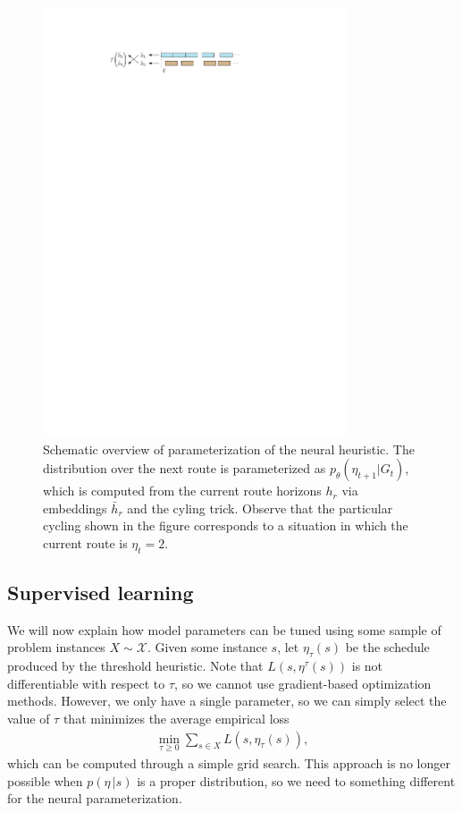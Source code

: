 \documentclass[a4paper]{article}
\theoremstyle{definition}
\theoremstyle{plain}
\begin{document}
\begin{figure}
  \centering
  \includegraphics[width=0.8\textwidth]{figures/single/embedding}
  \caption{Schematic overview of parameterization of the neural heuristic. The
    distribution over the next route is parameterized as
    $p_{\theta}(\eta_{t+1} | G_{t})$, which is computed from the current route horizons
    $h_{r}$ via embeddings $\bar{h}_{r}$ and the cyling trick. Observe that the
    particular cycling shown in the figure corresponds to a situation in which
    the current route is $\eta_{t} = 2$.}\label{fig:neural_embedding}
\end{figure}


\subsection{Supervised learning}

We will now explain how model parameters can be tuned using some sample of
problem instances $X \sim \mathcal{X}$.
%
Given some instance $s$, let $\eta_{\tau}(s)$ be the schedule produced by the
threshold heuristic. Note that $L(s, \eta^{\tau}(s))$ is not differentiable with
respect to $\tau$, so we cannot use gradient-based optimization methods.
However, we only have a single parameter, so we can simply select the value of
$\tau$ that minimizes the average empirical loss
%
\begin{align*}
  \min_{\tau \geq 0} \sum_{s \in X} L(s, \eta_{\tau}(s)) ,
\end{align*}
%
which can be computed through a simple grid search.
%
This approach is no longer possible when $p(\eta \, | s)$ is a proper distribution,
so we need to something different for the neural parameterization.
\end{document}
